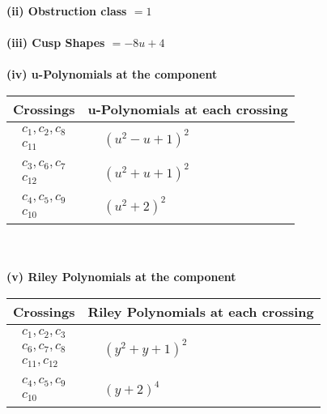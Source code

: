 \documentclass[1p]{elsarticle_modified}
\theoremstyle{definition}
\begin{document}
\flushleft \textbf{(ii) Obstruction class $= 1$}\\~\\
\flushleft \textbf{(iii) Cusp Shapes $= -8 u+4$}\\~\\
\newpage\renewcommand{\arraystretch}{1}
\flushleft \textbf{(iv) u-Polynomials at the component}\newline \\
\begin{tabular}{m{50pt}|m{274pt}}
Crossings & \hspace{64pt}u-Polynomials at each crossing \\
\hline $$\begin{aligned}c_{1},c_{2},c_{8}\\c_{11}\end{aligned}$$&$\begin{aligned}
&(u^2- u+1)^2
\end{aligned}$\\
\hline $$\begin{aligned}c_{3},c_{6},c_{7}\\c_{12}\end{aligned}$$&$\begin{aligned}
&(u^2+u+1)^2
\end{aligned}$\\
\hline $$\begin{aligned}c_{4},c_{5},c_{9}\\c_{10}\end{aligned}$$&$\begin{aligned}
&(u^2+2)^2
\end{aligned}$\\
\hline
\end{tabular}\\~\\
\newpage\renewcommand{\arraystretch}{1}
\flushleft \textbf{(v) Riley Polynomials at the component}\newline \\
\begin{tabular}{m{50pt}|m{274pt}}
Crossings & \hspace{64pt}Riley Polynomials at each crossing \\
\hline $$\begin{aligned}c_{1},c_{2},c_{3}\\c_{6},c_{7},c_{8}\\c_{11},c_{12}\end{aligned}$$&$\begin{aligned}
&(y^2+y+1)^2
\end{aligned}$\\
\hline $$\begin{aligned}c_{4},c_{5},c_{9}\\c_{10}\end{aligned}$$&$\begin{aligned}
&(y+2)^4
\end{aligned}$\\
\hline
\end{tabular}\\~\\
\end{document}

